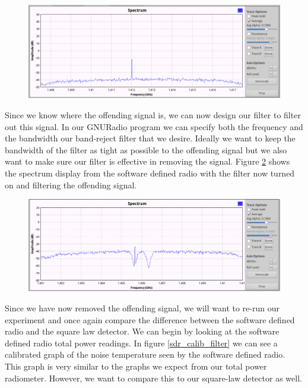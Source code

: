 {\begin{figure}[h!tb] \centering
\includegraphics[width=\textwidth]{Images/spectrum_interference.png}
\label{spectrum_interfering}
\end{figure}

Since we know where the offending signal is, we can now design our filter to filter out this signal.  In our GNURadio program we can specify both the frequency and the bandwidth our band-reject filter that we desire.  Ideally we want to keep the bandwidth of the filter as tight as possible to the offending signal but we also want to make sure our filter is effective in removing the signal.  Figure \ref{spectrum_filter} shows the spectrum display from the software defined radio with the filter now turned on and filtering the offending signal.

\begin{figure}[h!tb] \centering
\includegraphics[width=\textwidth]{Images/spectrum_filter.png}
\label{spectrum_filter}
\end{figure}

Since we have now removed the offending signal, we will want to re-run our experiment and once again compare the difference between the software defined radio and the square law detector. We can begin by looking at the software defined radio total power readings.  In figure \ref{sdr_calib_filter} we can see a calibrated graph of the noise temperature seen by the software defined radio.  This graph is very similar to the graphs we expect from our total power radiometer.  However, we want to compare this to our square-law detector as well.  

}
